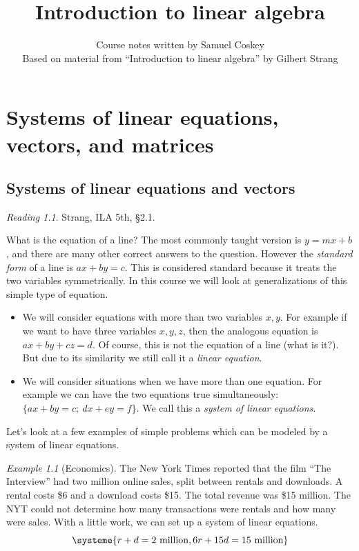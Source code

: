 \documentclass[11pt,oneside]{amsbook}
\title{Introduction to linear algebra}
\author{Course notes written by Samuel Coskey\\Based on material from ``Introduction to linear algebra'' by Gilbert Strang}
\theoremstyle{definition}
\theoremstyle{plain}
\theoremstyle{definition}
\theoremstyle{remark}
\newtheorem{example}[theorem]{Example}
\newtheorem*{reading}{Reading}
\numberwithin{equation}{section}
\numberwithin{figure}{section}
\begin{document}
\maketitle

\tableofcontents

\chapter{Systems of linear equations, vectors, and matrices}

\section{Systems of linear equations and vectors}

\begin{reading}
  Strang, ILA 5th, \S 2.1.
\end{reading}

What is the equation of a line? The most commonly taught version is $y=mx+b$, and there are many other correct answers to the question. However the \emph{standard form} of a line is $ax+by=c$. This is considered standard because it treats the two variables symmetrically. In this course we will look at generalizations of this simple type of equation.

\begin{itemize}
  \item We will consider equations with more than two variables $x,y$. For example if we want to have three variables $x,y,z$, then the analogous equation is $ax+by+cz=d$. Of course, this is not the equation of a line (what is it?). But due to its similarity we still call it a \emph{linear equation}.
  \item We will consider situations when we have more than one equation. For example we can have the two equations true simultaneously: $\{ax+by=c;\ dx+ey=f\}$. We call this a \emph{system of linear equations}.
\end{itemize}

Let's look at a few examples of simple problems which can be modeled by a system of linear equations.

\begin{example}[Economics]
  The New York Times reported that the film ``The Interview'' had two million online sales, split between rentals and downloads. A rental costs \$6 and a download costs \$15. The total revenue was \$15 million. The NYT could not determine how many transactions were rentals and how many were sales. With a little work, we can set up a system of linear equations.
  \[\systeme{r+d=2\text{ million},6r+15d=15\text{ million}}
  \]
\end{example}
\end{document}

